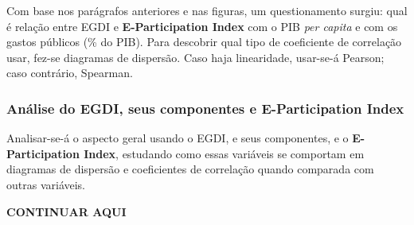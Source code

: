 Com base nos parágrafos anteriores e nas figuras, um questionamento surgiu: qual é relação entre EGDI e \textbf{E-Participation Index} com o PIB \textit{per capita} e com os gastos públicos (\% do PIB). Para descobrir qual tipo de coeficiente de correlação usar, fez-se diagramas de dispersão. Caso haja linearidade, usar-se-á Pearson; caso contrário, Spearman.

\subsubsection{Análise do EGDI, seus componentes e E-Participation Index}

Analisar-se-á o aspecto geral usando o EGDI, e seus componentes, e o \textbf{E-Participation Index}, estudando como essas variáveis se comportam em diagramas de dispersão e coeficientes de correlação quando comparada com outras variáveis.

\textbf{CONTINUAR AQUI}

